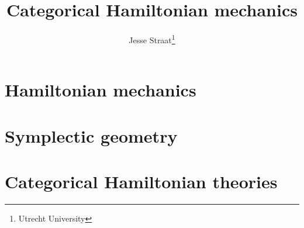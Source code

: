 \documentclass{article}
\title{Categorical Hamiltonian mechanics}
\author{Jesse Straat\thanks{Utrecht University}}
\begin{document}
\maketitle

\begin{multicols}{2}
	\section{Hamiltonian mechanics}
	\section{Symplectic geometry}
	\section{Categorical Hamiltonian theories}
\end{multicols}
\end{document}
